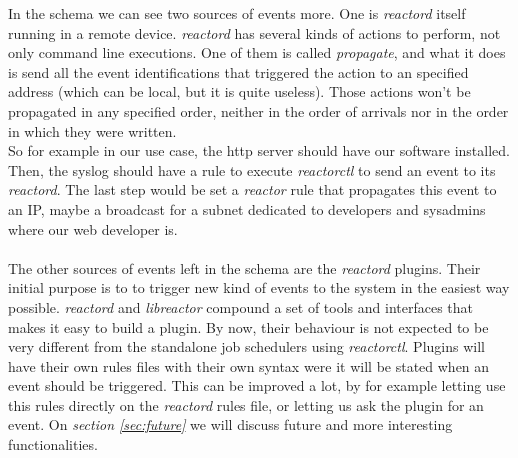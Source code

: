 In the schema we can see two sources of events more. One is \emph{reactord} itself running in a remote device. \emph{reactord} has several
kinds of actions to perform, not only command line executions. One of them is called \emph{propagate}, and what it does is send all the
event identifications that triggered the action to an specified address (which can be local, but it is quite useless). Those actions won't
be propagated in any specified order, neither in the order of arrivals nor in the order in which they were written.\\
So for example in our use case, the http server should have our software installed. Then, the syslog should have a rule to execute 
\emph{reactorctl} to send an event to its \emph{reactord}. The last step would be set a \emph{reactor} rule that propagates this event to 
an IP, maybe a broadcast for a subnet dedicated to developers and sysadmins where our web developer is.\\
\\
The other sources of events left in the schema are the \emph{reactord} plugins. Their initial purpose is to to trigger new kind of events 
to the system in the easiest way possible. \emph{reactord} and \emph{libreactor} compound a set of tools and interfaces that makes 
it easy to build a plugin. By now, their behaviour is not expected to be very different from the standalone job schedulers using 
\emph{reactorctl}. Plugins will have their own rules files with their own syntax were it will be stated when an event should be triggered. 
This can be improved a lot, by for example letting use this rules directly on the \emph{reactord} rules file, or letting us ask the plugin
for an event. On \emph{section \ref{sec:future}} we will discuss future and more interesting functionalities.
